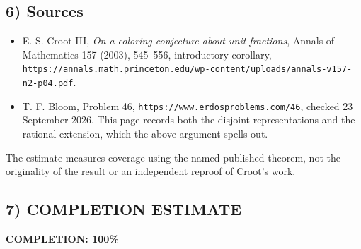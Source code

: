 \subsection{6) Sources}
\begin{itemize}
\item E. S. Croot III, \emph{On a coloring conjecture about unit
fractions}, Annals of Mathematics 157 (2003), 545--556, introductory
corollary, \texttt{https://annals.math.princeton.edu/wp-content/uploads/annals-v157-n2-p04.pdf}.
\item T. F. Bloom, Problem 46,
\texttt{https://www.erdosproblems.com/46}, checked 23 September 2026.
This page records both the disjoint representations and the rational
extension, which the above argument spells out.
\end{itemize}

The estimate measures coverage using the named published theorem, not
the originality of the result or an independent reproof of Croot's work.
\subsection{7) COMPLETION ESTIMATE}
\textbf{COMPLETION: 100\%}

